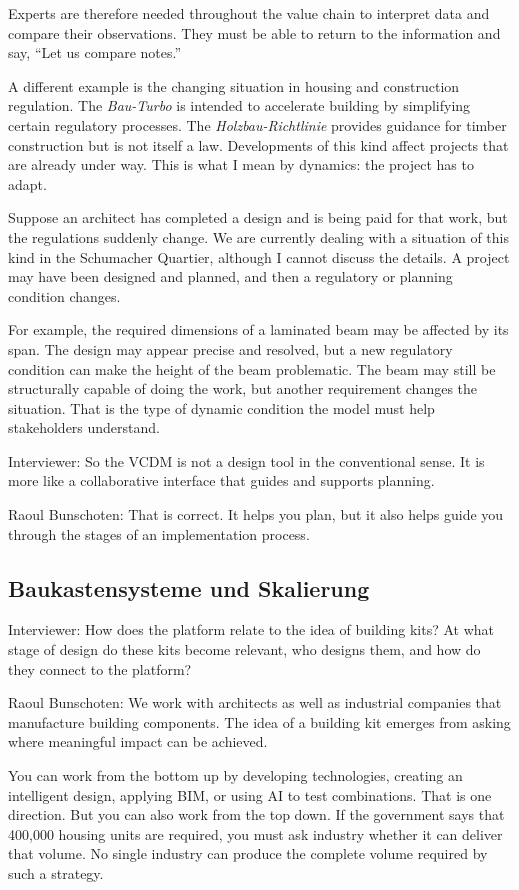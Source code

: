 Experts are therefore needed throughout the value chain to interpret data and compare their observations. They must be able to return to the information and say, “Let us compare notes.”

A different example is the changing situation in housing and construction regulation. The \textit{Bau-Turbo} is intended to accelerate building by simplifying certain regulatory processes. The \textit{Holzbau-Richtlinie} provides guidance for timber construction but is not itself a law. Developments of this kind affect projects that are already under way. This is what I mean by dynamics: the project has to adapt.

Suppose an architect has completed a design and is being paid for that work, but the regulations suddenly change. We are currently dealing with a situation of this kind in the Schumacher Quartier, although I cannot discuss the details. A project may have been designed and planned, and then a regulatory or planning condition changes.

For example, the required dimensions of a laminated beam may be affected by its span. The design may appear precise and resolved, but a new regulatory condition can make the height of the beam problematic. The beam may still be structurally capable of doing the work, but another requirement changes the situation. That is the type of dynamic condition the model must help stakeholders understand.

Interviewer: So the VCDM is not a design tool in the conventional sense. It is more like a collaborative interface that guides and supports planning.

Raoul Bunschoten: That is correct. It helps you plan, but it also helps guide you through the stages of an implementation process.

\subsection{Baukastensysteme und Skalierung}

Interviewer: How does the platform relate to the idea of building kits? At what stage of design do these kits become relevant, who designs them, and how do they connect to the platform?

Raoul Bunschoten: We work with architects as well as industrial companies that manufacture building components. The idea of a building kit emerges from asking where meaningful impact can be achieved.

You can work from the bottom up by developing technologies, creating an intelligent design, applying BIM, or using AI to test combinations. That is one direction. But you can also work from the top down. If the government says that 400,000 housing units are required, you must ask industry whether it can deliver that volume. No single industry can produce the complete volume required by such a strategy.

